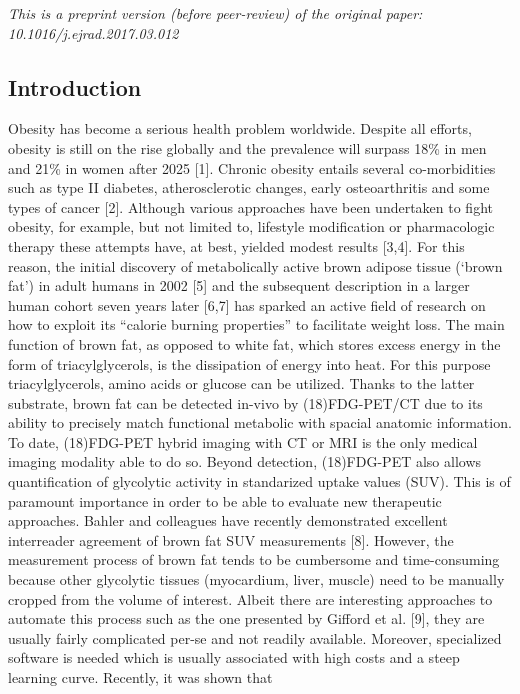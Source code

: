 \documentclass[]{elsarticle} %
\begin{document}
\emph{This is a preprint version (before peer-review) of the original
paper: 10.1016/j.ejrad.2017.03.012}

\subsection{Introduction}\label{introduction}

Obesity has become a serious health problem worldwide. Despite all
efforts, obesity is still on the rise globally and the prevalence will
surpass 18\% in men and 21\% in women after 2025 {[}1{]}. Chronic
obesity entails several co-morbidities such as type II diabetes,
atherosclerotic changes, early osteoarthritis and some types of cancer
{[}2{]}. Although various approaches have been undertaken to fight
obesity, for example, but not limited to, lifestyle modification or
pharmacologic therapy these attempts have, at best, yielded modest
results {[}3,4{]}. For this reason, the initial discovery of
metabolically active brown adipose tissue (`brown fat') in adult humans
in 2002 {[}5{]} and the subsequent description in a larger human cohort
seven years later {[}6,7{]} has sparked an active field of research on
how to exploit its ``calorie burning properties'' to facilitate weight
loss. The main function of brown fat, as opposed to white fat, which
stores excess energy in the form of triacylglycerols, is the dissipation
of energy into heat. For this purpose triacylglycerols, amino acids or
glucose can be utilized. Thanks to the latter substrate, brown fat can
be detected in-vivo by (18)FDG-PET/CT due to its ability to precisely
match functional metabolic with spacial anatomic information. To date,
(18)FDG-PET hybrid imaging with CT or MRI is the only medical imaging
modality able to do so. Beyond detection, (18)FDG-PET also allows
quantification of glycolytic activity in standarized uptake values
(SUV). This is of paramount importance in order to be able to evaluate
new therapeutic approaches. Bahler and colleagues have recently
demonstrated excellent interreader agreement of brown fat SUV
measurements {[}8{]}. However, the measurement process of brown fat
tends to be cumbersome and time-consuming because other glycolytic
tissues (myocardium, liver, muscle) need to be manually cropped from the
volume of interest. Albeit there are interesting approaches to automate
this process such as the one presented by Gifford et al. {[}9{]}, they
are usually fairly complicated per-se and not readily available.
Moreover, specialized software is needed which is usually associated
with high costs and a steep learning curve. Recently, it was shown that
\end{document}
